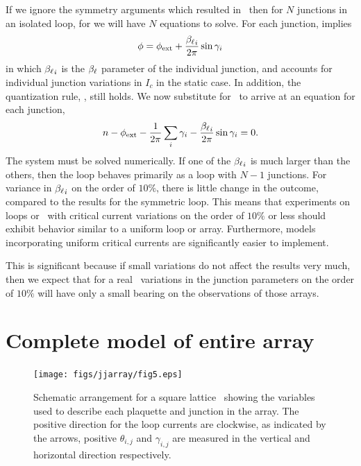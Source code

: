 If we ignore the symmetry arguments which resulted in \
then for $N$ junctions in an isolated loop, for we will have $N$ equations to
solve. For each junction, \EqnRef{eqn:ftotvsfext} implies
%
\begin{equation}
{\ensuremath{\phi}} = \phi_{\mathrm{ext}} + {{\beta_\ell}_i\over 2 \pi} \sin \gamma_i
\label{eqn:ftotvsfext_indiv}
\end{equation}
%
in which ${\beta_\ell}_i$ is the $\beta_\ell$ parameter of the individual junction,
and accounts for individual junction variations in $I_c$ in the static 
case.  
In addition, the quantization rule, , still holds.
We now substitute
 for 
\phitot\ to arrive at an equation for each junction, 
%
\begin{equation}
n-\phi_{\mathrm{ext}} - {1\over 2\pi}\sum_i \gamma_i-{{\beta_\ell}_i\over 2\pi}\sin\gamma_i=0
\mathrm{.}
\end{equation}
%
The system must be solved numerically.
If one of the 
${\beta_\ell}_i$ is much larger than the others, then the loop behaves primarily
as a loop with $N-1$ junctions. For variance in ${\beta_\ell}_i$ on the order
of $10\%$, there is little change in the outcome, 
compared to the results for the
symmetric loop. 
This means that experiments on loops or \jjas\ with critical 
current
variations on the order of $10\%$ or less should exhibit behavior
similar to a uniform loop or array. Furthermore, models incorporating
uniform critical currents are significantly easier to implement.

This is significant because if small variations do not
affect the results very much, then
we expect that for a real \jja\ variations 
in the junction parameters on the order of $10\%$ will have only a small
bearing on the observations of those arrays. 

\section{Complete model of entire array}
\label{sec:entire_array_model}

%
\begin{figure}[p]
\texttt{[image: figs/jjarray/fig5.eps]}
\caption[Sketch of \jja\ with labeled variables for numerical modeling.]
{Schematic arrangement for a square lattice \jja\ showing the 
variables used to describe each plaquette and junction in the
array. The positive direction for the loop currents are clockwise,
as indicated by the arrows, positive $\theta_{i,j}$ and $\gamma_{i,j}$
are measured in the vertical and horizontal direction respectively.}
\label{fig:array_model_sketch}
\end{figure}

